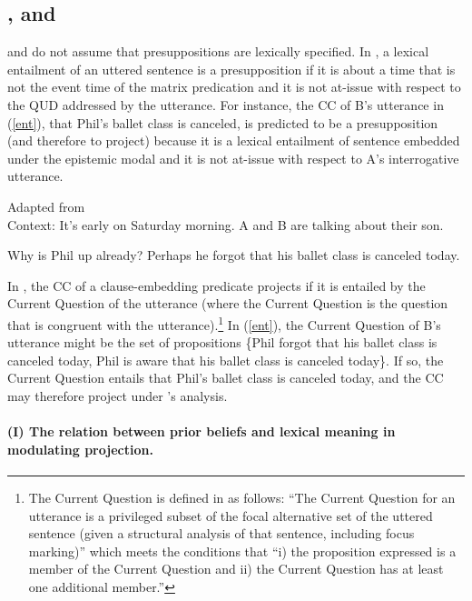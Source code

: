 \documentclass[11pt,fleqn]{article}
\newcommand{\6}{\mbox{$[\hspace*{-.6mm}[$}}
\newcommand{\9}{\mbox{$]\hspace*{-.6mm}]$}}
\newcommand{\citepos}[1]{\citeauthor{#1}'s \citeyear{#1}}
\begin{document}
\subsection{\citealt{abrusan2011,abrusan2016}, and \citealt*{best-question}}\label{s42}

\citealt{abrusan2011,abrusan2016} and \citealt{best-question} do not assume that presuppositions are lexically specified. In \citealt{abrusan2011,abrusan2016}, a lexical entailment of an uttered sentence is a presupposition if it is about a time that is not the event time of the matrix predication and it is not at-issue with respect to the QUD addressed by the utterance. For instance, the CC of B's utterance in (\ref{ent}), that Phil's ballet class is canceled, is predicted to be a presupposition (and therefore to project) because it is a lexical entailment of sentence embedded under the epistemic modal and it is not at-issue with respect to A's interrogative utterance. 

\begin{exe}
\ex \label{ent} Adapted from \citealt[188]{best-question} \\ Context: It's early on Saturday morning. A and B are talking about their son. 
\begin{xlist}
 Why is Phil up already?
 Perhaps he forgot that his ballet class is canceled today. 
\end{xlist}
\end{exe}

In \citealt{best-question}, the CC of a clause-embedding predicate projects if it is entailed by the Current Question of the utterance (where the Current Question is the question that is congruent with the utterance).\footnote{The Current Question is defined in \citealt[194]{best-question} as follows: ``The Current Question for an utterance is a privileged subset of the focal alternative set of the uttered sentence (given a structural analysis of that sentence, including focus marking)'' which meets the conditions that ``i) the proposition expressed is a member of the Current Question and ii) the Current Question has at least one additional member.''} In (\ref{ent}), the Current Question of B's utterance might be the set of propositions \{Phil forgot that his ballet class is canceled today, Phil is aware that his ballet class is canceled today\}. If so, the Current Question entails that Phil's ballet class is canceled today, and the CC may therefore project under \citepos{best-question} analysis.


\paragraph{(I) The relation between prior beliefs and lexical meaning in modulating projection.}
\end{document}
